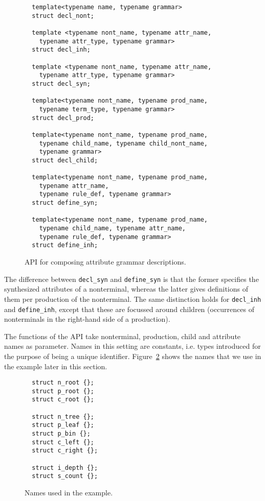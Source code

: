 \documentclass{llncs}
\begin{document}
  \begin{figure}[tb]
  \begin{lstlisting}
  template<typename name, typename grammar>
  struct decl_nont;

  template <typename nont_name, typename attr_name,
    typename attr_type, typename grammar>
  struct decl_inh;

  template <typename nont_name, typename attr_name,
    typename attr_type, typename grammar>
  struct decl_syn;

  template<typename nont_name, typename prod_name,
    typename term_type, typename grammar>
  struct decl_prod;

  template<typename nont_name, typename prod_name,
    typename child_name, typename child_nont_name,
    typename grammar>
  struct decl_child;

  template<typename nont_name, typename prod_name,
    typename attr_name,
    typename rule_def, typename grammar>
  struct define_syn;

  template<typename nont_name, typename prod_name,
    typename child_name, typename attr_name,
    typename rule_def, typename grammar>
  struct define_inh;
  \end{lstlisting}
  \caption{API for composing attribute grammar descriptions.}
  \label{fig:api}
  \end{figure}

  The difference between \lstinline$decl_syn$ and \lstinline$define_syn$
  is that the former specifies the synthesized attributes of a nonterminal,
  whereas the latter gives definitions of them per production of the
  nonterminal. The same distinction holds for \lstinline$decl_inh$ and
  \lstinline$define_inh$, except that these are focussed around
  children (occurrences of nonterminals in the right-hand side of a
  production).

  The functions of the API take nonterminal, production,
  child and attribute names as parameter. Names in this
  setting are constants, i.e.
  types introduced for the purpose of being a unique
  identifier. Figure~\ref{fig:idents} shows the names that
  we use in the example later in this section.

  \begin{figure}[tb]
  \begin{lstlisting}
  struct n_root {};
  struct p_root {};
  struct c_root {};

  struct n_tree {};
  struct p_leaf {};
  struct p_bin {};
  struct c_left {};
  struct c_right {};

  struct i_depth {};
  struct s_count {};
  \end{lstlisting}
  \caption{Names used in the example.}
  \label{fig:idents}
  \end{figure}
\end{document}
